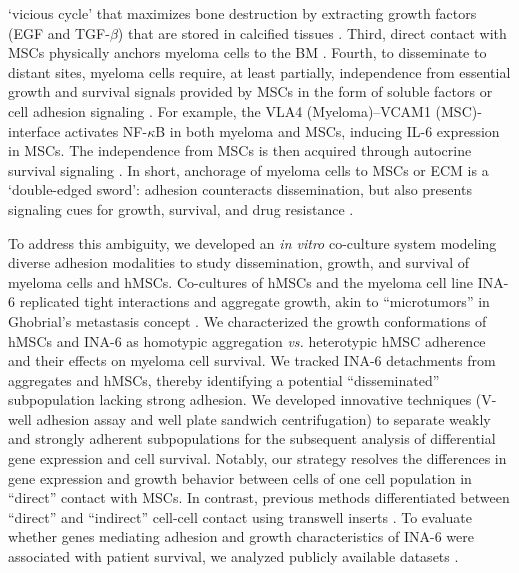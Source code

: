 ‘vicious cycle’ that maximizes bone destruction by extracting growth factors
(EGF and TGF-$\beta$) that are stored in calcified tissues
\cite{glaveyProteomicCharacterizationHuman2017}. Third, direct contact with MSCs
physically anchors myeloma cells to the BM
\cite{zeissigTumourDisseminationMultiple2020,sanz-rodriguezCharacterizationVLA4dependentMyeloma1999}.
Fourth, to disseminate to distant sites, myeloma cells require, at least
partially, independence from essential growth and survival signals provided by
MSCs in the form of soluble factors or cell adhesion signaling
\cite{garcia-ortizRoleTumorMicroenvironment2021, chatterjeePresenceBoneMarrow2002,hideshimaUnderstandingMultipleMyeloma2007}.
For example, the VLA4 (Myeloma)–VCAM1 (MSC)-interface activates NF-$\kappa$B in both
myeloma and MSCs, inducing IL-6 expression in MSCs. The independence from MSCs
is then acquired through autocrine survival signaling
\cite{frassanitoAutocrineInterleukin6Production2001, urashimaCD40LigandTriggered1995}.
In short, anchorage of myeloma cells to MSCs or ECM is a ‘double-edged sword’:
adhesion counteracts dissemination, but also presents signaling cues for growth,
survival, and drug resistance \cite{solimandoDrugResistanceMultiple2022}.


To address this ambiguity, we developed an \textit{in vitro} co-culture system
modeling diverse adhesion modalities to study dissemination, growth, and
survival of myeloma cells and hMSCs. Co-cultures of hMSCs and the myeloma cell
line INA-6 replicated tight interactions and aggregate growth, akin to
``microtumors'' in Ghobrial’s metastasis concept
\cite{ghobrialMyelomaModelProcess2012}. We characterized the growth
conformations of hMSCs and INA-6 as homotypic aggregation \textit{vs.}
heterotypic hMSC adherence and their effects on myeloma cell survival. We
tracked INA-6 detachments from aggregates and hMSCs, thereby identifying a
potential ``disseminated'' subpopulation lacking strong adhesion. We developed
innovative techniques (V-well adhesion assay and well plate sandwich
centrifugation) to separate weakly and strongly adherent subpopulations for the
subsequent analysis of differential gene expression and cell survival. Notably,
our strategy resolves the differences in gene expression and growth behavior
between cells of one cell population in ``direct'' contact with MSCs. In
contrast, previous methods differentiated between ``direct'' and ``indirect''
cell-cell contact using transwell inserts
\cite{dziadowiczBoneMarrowStromaInduced2022}. To evaluate whether genes
mediating adhesion and growth characteristics of INA-6 were associated with
patient survival, we analyzed publicly available datasets
\cite{seckingerTargetExpressionGeneration2017b,seckingerCD38ImmunotherapeuticTarget2018}.


